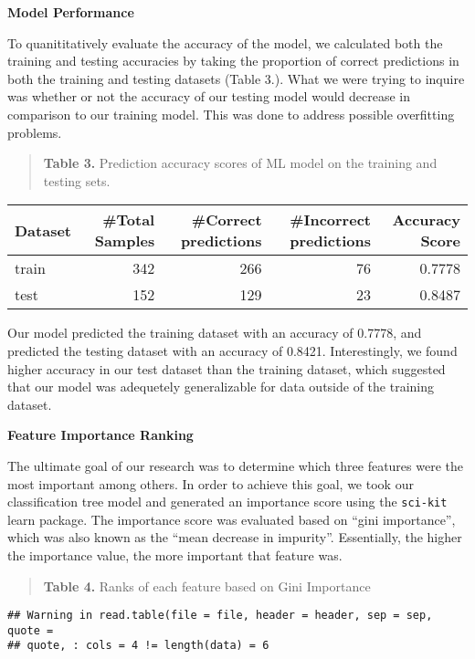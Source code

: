 \documentclass[]{article}
\begin{document}
\newpage

\textbf{Model Performance}

To quanititatively evaluate the accuracy of the model, we calculated
both the training and testing accuracies by taking the proportion of
correct predictions in both the training and testing datasets (Table
3.). What we were trying to inquire was whether or not the accuracy of
our testing model would decrease in comparison to our training model.
This was done to address possible overfitting problems.

\begin{quote}
\textbf{Table 3.} Prediction accuracy scores of ML model on the training
and testing sets.
\end{quote}

\begin{longtable}[]{@{}lrrrr@{}}
\toprule
Dataset & \#Total Samples & \#Correct predictions & \#Incorrect
predictions & Accuracy Score\tabularnewline
\midrule
\endhead
train & 342 & 266 & 76 & 0.7778\tabularnewline
test & 152 & 129 & 23 & 0.8487\tabularnewline
\bottomrule
\end{longtable}

Our model predicted the training dataset with an accuracy of 0.7778, and
predicted the testing dataset with an accuracy of 0.8421. Interestingly,
we found higher accuracy in our test dataset than the training dataset,
which suggested that our model was adequetely generalizable for data
outside of the training dataset.

\textbf{Feature Importance Ranking}

The ultimate goal of our research was to determine which three features
were the most important among others. In order to achieve this goal, we
took our classification tree model and generated an importance score
using the \texttt{sci-kit} learn package. The importance score was
evaluated based on ``gini importance'', which was also known as the
``mean decrease in impurity''. Essentially, the higher the importance
value, the more important that feature was.

\begin{quote}
\textbf{Table 4.} Ranks of each feature based on Gini Importance
\end{quote}

\begin{verbatim}
## Warning in read.table(file = file, header = header, sep = sep, quote =
## quote, : cols = 4 != length(data) = 6
\end{verbatim}
\end{document}
